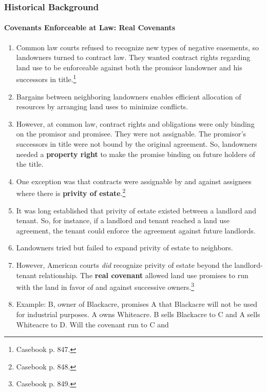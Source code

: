 \subsubsection{Historical Background}

\paragraph{Covenants Enforceable at Law: Real Covenants}

\begin{enumerate}
    \item Common law courts refused to recognize new types of negative 
    easements, so landowners turned to contract law. They wanted contract 
    rights regarding land use to be enforceable against both the promisor 
    landowner and his successors in title.\footnote{Casebook p. 847.}
    \item Bargains between neighboring landowners enables efficient allocation 
    of resources by arranging land uses to minimize conflicts.
    \item However, at common law, contract rights and obligations were only 
    binding on the promisor and promisee. They were not assignable. The 
    promisor's successors in title were not bound by the original agreement. 
    So, landowners needed a \textbf{property right} to make the promise 
    binding on future holders of the title.
    \item One exception was that contracts were assignable by and against 
    assignees where there is \textbf{privity of estate}.\footnote{Casebook p. 
    848.}
    \item It was long established that privity of estate existed between a 
    landlord and tenant. So, for instance, if a landlord and tenant reached a 
    land use agreement, the tenant could enforce the agreement against future 
    landlords.
    \item Landowners tried but failed to expand privity of estate to 
    neighbors.
    \item However, American courts \emph{did} recognize privity of estate 
    beyond the landlord-tenant relationship. The \textbf{real covenant} 
    allowed land use promises to run with the land in favor of and against 
    successive owners.\footnote{Casebook p. 849.}
    \item Example: B, owner of Blackacre, promises A that Blackacre will not be 
    used for industrial purposes. A owns Whiteacre. B sells Blackacre to C 
    and A sells Whiteacre to D. Will the covenant run to C and 

\end{enumerate}
